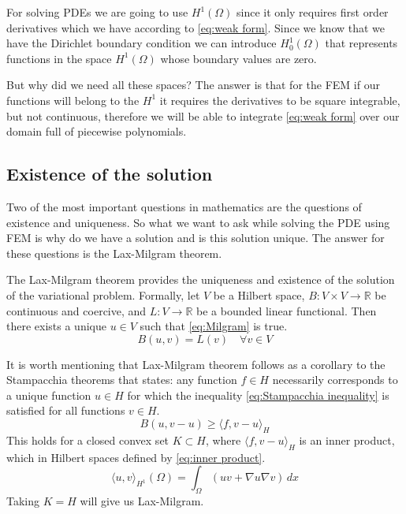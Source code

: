 \documentclass[acmsmall,screen]{MapleTrans}
\begin{document}
For solving PDEs we are going to use $H^{1}(\Omega)$ since it only requires first order derivatives which we have according to \eqref{eq:weak form}. 
Since we know that we have the Dirichlet boundary condition we can introduce $H_{0}^{1}(\Omega)$ that represents functions in the space $H^{1}(\Omega)$ whose boundary values are zero.

But why did we need all these spaces? The answer is that for the FEM if our functions will belong to the $H^1$ it requires the derivatives to be square integrable, but not continuous, therefore we will be able to integrate \eqref{eq:weak form} over our domain full of piecewise polynomials. 


\subsection{Existence of the solution}
Two of the most important questions in mathematics are the questions of existence and uniqueness. So what we want to ask while solving the PDE using FEM is why do we have a solution and is this solution unique. The answer for these questions is the Lax-Milgram theorem.

The Lax-Milgram theorem provides the uniqueness and existence of the solution of the variational problem. Formally, let $V$ be a Hilbert space, $B: V \times V \rightarrow \mathbb{R}$ be continuous and coercive, and $L: V \rightarrow \mathbb{R}$ be a bounded linear functional. Then there exists a unique $u \in V$ such that \eqref{eq:Milgram} is true.
\begin{equation}
    B(u, v) = L(v) \quad \forall v \in V
    \label{eq:Milgram}
\end{equation}

It is worth mentioning that Lax-Milgram theorem follows as a corollary to the Stampacchia theorems that states: any function $f \in H$ necessarily corresponds to a unique function $u \in H$ for which the inequality \eqref{eq:Stampacchia inequality} is satisfied for all functions $v \in H$.
\begin{equation}
    B(u, v - u) \geq \langle f, v - u \rangle_H
    \label{eq:Stampacchia inequality}
\end{equation}
This holds for a closed convex set $K \subset H$, where $\langle f, v - u \rangle_H$ is an inner product, which in Hilbert spaces defined by \eqref{eq:inner product}.
\begin{equation}
    \langle u, v \rangle_{H^1}(\Omega) = \int_{\Omega}(uv + \nabla u \nabla v) \, dx
    \label{eq:inner product}
\end{equation}
Taking $K = H$ will give us Lax-Milgram.
\end{document}
